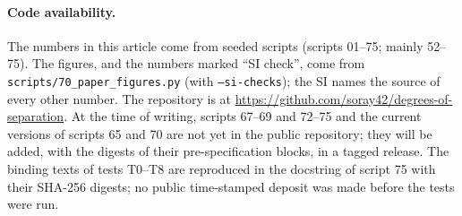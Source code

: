 \documentclass[11pt]{article}
\begin{document}
\paragraph{Code availability.} The numbers in this article come from seeded scripts (scripts 01--75; mainly
52--75). The figures, and the numbers marked ``SI check'', come from \texttt{scripts/70\_paper\_figures.py} (with
\texttt{--si-checks}); the SI names the source of every other number. The repository is at
\url{https://github.com/soray42/degrees-of-separation}. At the time of writing, scripts 67--69 and 72--75 and the
current versions of scripts 65 and 70 are not yet in the public repository; they will be added, with the digests of
their pre-specification blocks, in a tagged release. The binding texts of tests T0--T8 are reproduced in the
docstring of script 75 with their SHA-256 digests; no public time-stamped deposit was made before the tests were
run.



\end{document}
